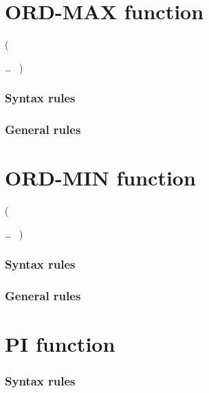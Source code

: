 \section{ORD-MAX function}

\begin{syntax}
    (
  \begin{1=}
    \argument
  \end{1=} \ldots
  \ {})
\end{syntax}

\subsubsection{Syntax rules}

\subsubsection{General rules}

\section{ORD-MIN function}

\begin{syntax}
    (
  \begin{1=}
    \argument
  \end{1=} \ldots
  \ {})
\end{syntax}

\subsubsection{Syntax rules}

\subsubsection{General rules}

\section{PI function}

\begin{syntax}
   
\end{syntax}

\subsubsection{Syntax rules}


